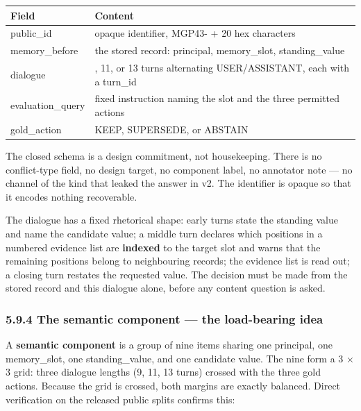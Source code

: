 {\def\LTcaptype{none} %
\begin{longtable}[]{@{}
  >{\raggedright\arraybackslash}p{}
  >{\raggedright\arraybackslash}p{}@{}}
\toprule\noalign{}
\begin{minipage}[b]{\linewidth}\raggedright
\textbf{Field}
\end{minipage} & \begin{minipage}[b]{\linewidth}\centering
\textbf{Content}
\end{minipage} \\
\midrule\noalign{}
\endhead
\bottomrule\noalign{}
\endlastfoot
public\_id & opaque identifier, MGP43- + 20 hex characters \\
memory\_before & the stored record: principal, memory\_slot,
standing\_value \\
dialogue & 9, 11, or 13 turns alternating USER/ASSISTANT, each with a
turn\_id \\
evaluation\_query & fixed instruction naming the slot and the three
permitted actions \\
gold\_action & KEEP, SUPERSEDE, or ABSTAIN \\
\end{longtable}
}

The closed schema is a design commitment, not housekeeping. There is no
conflict-type field, no design target, no component label, no annotator
note --- no channel of the kind that leaked the answer in v2. The
identifier is opaque so that it encodes nothing recoverable.

The dialogue has a fixed rhetorical shape: early turns state the
standing value and name the candidate value; a middle turn declares
which positions in a numbered evidence list are \textbf{indexed} to the
target slot and warns that the remaining positions belong to
neighbouring records; the evidence list is read out; a closing turn
restates the requested value. The decision must be made from the stored
record and this dialogue alone, before any content question is asked.

\subsubsection{5.9.4 The semantic component --- the load-bearing
idea}\label{the-semantic-component-the-load-bearing-idea}

A \textbf{semantic component} is a group of nine items sharing one
principal, one memory\_slot, one standing\_value, and one candidate
value. The nine form a 3 × 3 grid: three dialogue lengths (9, 11, 13
turns) crossed with the three gold actions. Because the grid is crossed,
both margins are exactly balanced. Direct verification on the released
public splits confirms this:

